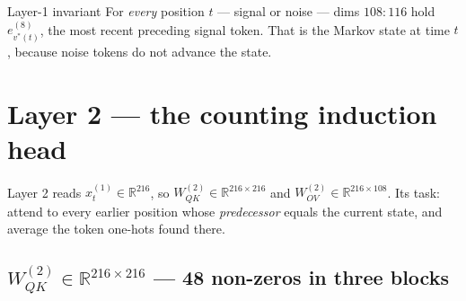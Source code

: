 \documentclass[11pt]{article}
\newcommand{\R}{\mathbb{R}}
\newcommand{\Wqk}{W_{QK}}
\newcommand{\Wov}{W_{OV}}
\begin{document}
\begin{warningbox}{Layer-1 invariant}
For \emph{every} position $t$ --- signal or noise --- dims $108{:}116$ hold $e^{(8)}_{v^*(t)}$,
the most recent preceding signal token. That is the Markov state at time $t$, because noise
tokens do not advance the state.
\end{warningbox}

\section{Layer 2 --- the counting induction head}

Layer 2 reads $x^{(1)}_t\in\R^{216}$, so $\Wqk^{(2)}\in\R^{216\times216}$ and
$\Wov^{(2)}\in\R^{216\times108}$. Its task: attend to every earlier position whose
\emph{predecessor} equals the current state, and average the token one-hots found there.

\subsection{$\Wqk^{(2)}\in\R^{216\times216}$ --- 48 non-zeros in three blocks}
\end{document}
